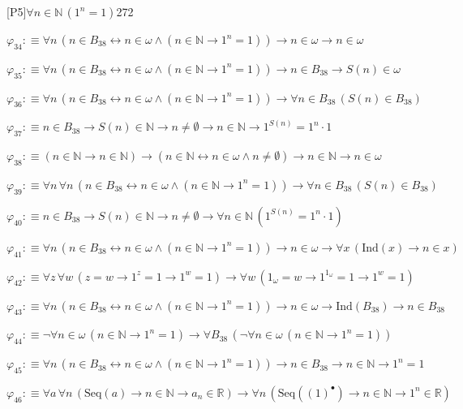 \begin{fullproof}{[P5]}{$\forall n \in \mathbb{N}\,({{1}^{n}} = 1)$}{272}
\begin{abbrevlist}
\item $\varphi_{34} :\equiv \forall n\,(n \in B_{38} \leftrightarrow n \in \omega \land (n \in \mathbb{N} \to {{1}^{n}} = 1)) \to n \in \omega \to n \in \omega$
\item $\varphi_{35} :\equiv \forall n\,(n \in B_{38} \leftrightarrow n \in \omega \land (n \in \mathbb{N} \to {{1}^{n}} = 1)) \to n \in B_{38} \to S(n) \in \omega$
\item $\varphi_{36} :\equiv \forall n\,(n \in B_{38} \leftrightarrow n \in \omega \land (n \in \mathbb{N} \to {{1}^{n}} = 1)) \to \forall n \in B_{38}\,(S(n) \in B_{38})$
\item $\varphi_{37} :\equiv n \in B_{38} \to S(n) \in \mathbb{N} \to n \neq \emptyset \to n \in \mathbb{N} \to {{1}^{S(n)}} = {{1}^{n}} \cdot 1$
\item $\varphi_{38} :\equiv (n \in \mathbb{N} \to n \in \mathbb{N}) \to (n \in \mathbb{N} \leftrightarrow n \in \omega \land n \neq \emptyset) \to n \in \mathbb{N} \to n \in \omega$
\item $\varphi_{39} :\equiv \forall n\,\forall n\,(n \in B_{38} \leftrightarrow n \in \omega \land (n \in \mathbb{N} \to {{1}^{n}} = 1)) \to \forall n \in B_{38}\,(S(n) \in B_{38})$
\item $\varphi_{40} :\equiv n \in B_{38} \to S(n) \in \mathbb{N} \to n \neq \emptyset \to \forall n \in \mathbb{N}\,({{1}^{S(n)}} = {{1}^{n}} \cdot 1)$
\item $\varphi_{41} :\equiv \forall n\,(n \in B_{38} \leftrightarrow n \in \omega \land (n \in \mathbb{N} \to {{1}^{n}} = 1)) \to n \in \omega \to \forall x\,(\mathrm{Ind}(x) \to n \in x)$
\item $\varphi_{42} :\equiv \forall z\,\forall w\,(z = w \to {{1}^{z}} = 1 \to {{1}^{w}} = 1) \to \forall w\,(1_{\omega} = w \to {{1}^{1_{\omega}}} = 1 \to {{1}^{w}} = 1)$
\item $\varphi_{43} :\equiv \forall n\,(n \in B_{38} \leftrightarrow n \in \omega \land (n \in \mathbb{N} \to {{1}^{n}} = 1)) \to n \in \omega \to \mathrm{Ind}(B_{38}) \to n \in B_{38}$
\item $\varphi_{44} :\equiv \neg \forall n \in \omega\,(n \in \mathbb{N} \to {{1}^{n}} = 1) \to \forall B_{38}\,(\neg \forall n \in \omega\,(n \in \mathbb{N} \to {{1}^{n}} = 1))$
\item $\varphi_{45} :\equiv \forall n\,(n \in B_{38} \leftrightarrow n \in \omega \land (n \in \mathbb{N} \to {{1}^{n}} = 1)) \to n \in B_{38} \to n \in \mathbb{N} \to {{1}^{n}} = 1$
\item $\varphi_{46} :\equiv \forall a\,\forall n\,(\mathrm{Seq}(a) \to n \in \mathbb{N} \to a_{n} \in \mathbb{R}) \to \forall n\,(\mathrm{Seq}({(1)^{\bullet}}) \to n \in \mathbb{N} \to {{1}^{n}} \in \mathbb{R})$

\end{abbrevlist}
\end{fullproof}
